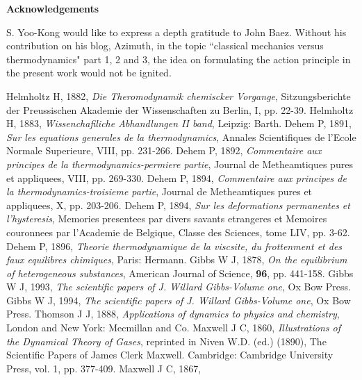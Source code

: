 \documentclass[12pt]{article}
\makeatletter
\numberwithin{equation}{section}
\newcommand\ackname{Acknowledgements}
\newenvironment{acknowledgements}{
	\titlepage
	\null\vfil
	\@beginparpenalty\@lowpenalty
	\begin{center}
		\bfseries \ackname
		\@endparpenalty\@M1
\end{center}}
{\par\vfil\null\endtitlepage}
\newenvironment{acknowledgements}{
	\if@twocolumn
	\section*{\abstractname}
	\else
	\small
	\begin{center}
		{\bfseries \ackname\vspace{-.5em}\vspace{\z@}}
	\end{center}
	\quotation
	\fi}
{\if@twocolumn\else\endquotation\fi}
\theoremstyle{remark}
\theoremstyle{definition}
\makeatother
\begin{document}
\begin{acknowledgements}

S. Yoo-Kong would like to express a depth gratitude to John Baez. Without his contribution on his blog, Azimuth, in the topic ``classical mechanics versus thermodynamics" part 1, 2 and 3, the idea on formulating the action principle in the present work would not be ignited.
\end{acknowledgements}
\begin{thebibliography}{}
Helmholtz H, 1882, 
\emph{Die Theromodynamik chemiscker Vorgange}, 
Sitzungsberichte der Preussischen Akademie der Wissenschaften zu Berlin, I, pp. 22-39.
%
Helmholtz H, 1883, 
\emph{Wissenchafiliche Abhandlungen II band}, Leipzig: Barth.
%
%
Dehem P, 1891, 
\emph{Sur les equations generales de la thermodynamics}, Annales Scientifiques de l'Ecole Normale Superieure, VIII, pp. 231-266.
%
%
Dehem P, 1892, 
\emph{Commentaire aux principes de la thermodynamics-permiere partie}, Journal de Metheamtiques pures et appliquees, VIII, pp. 269-330.
%
%
Dehem P, 1894, 
\emph{Commentaire aux principes de la thermodynamics-troisieme partie}, Journal de Metheamtiques pures et appliquees, X, pp. 203-206.
%
%
Dehem P, 1894, 
\emph{Sur les deformations permanentes et l'hysteresis}, Memories presentees par divers savants etrangeres et Memoires couronnees par l'Academie de Belgique, Classe des Sciences, tome LIV, pp. 3-62.
%
%
Dehem P, 1896, 
\emph{Theorie thermodynamique de la viscsite, du frottenment et des faux equilibres chimiques}, Paris: Hermann.
%
Gibbs W J, 1878, 
\emph{On the equilibrium of heterogeneous substances}, 
American Journal of Science, \textbf{96}, pp. 441-158.
%
Gibbs W J, 1993, 
\emph{The scientific papers of J. Willard Gibbs-Volume one}, Ox Bow Press.
%
%
Gibbs W J, 1994, 
\emph{The scientific papers of J. Willard Gibbs-Volume one}, Ox Bow Press.
%
%
Thomson J J, 1888, 
\emph{Applications of dynamics to physics and chemistry}, London and New York: Mecmillan and Co.
%
%
Maxwell J C, 1860, 
\emph{Illustrations of the Dynamical Theory of Gases}, reprinted in Niven W.D. (ed.) (1890), The Scientific Papers of James Clerk Maxwell. Cambridge: Cambridge University Press, vol. 1, pp. 377-409.
%
%
Maxwell J C, 1867, 

\end{thebibliography}
\end{document}
